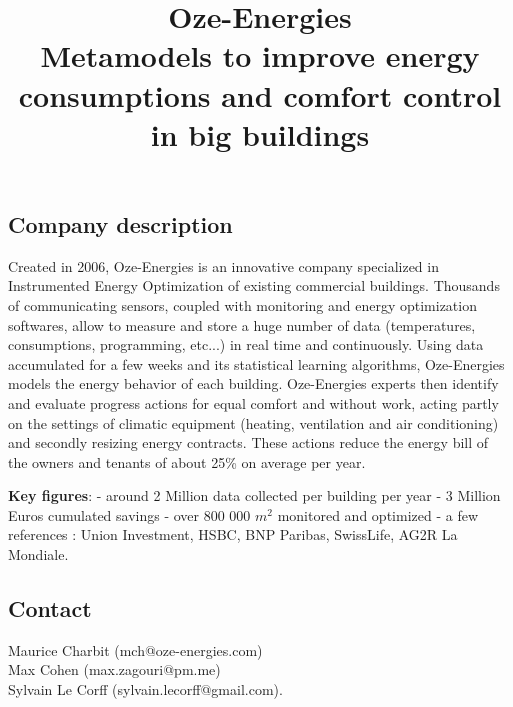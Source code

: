 \documentclass[nolayout]{article}
\begin{document}
\title{Oze-Energies\\
Metamodels to improve energy consumptions and comfort control in big buildings}
\date{}

\author{}

\maketitle

\subsection*{Company description}
Created in 2006, Oze-Energies is an innovative company specialized in Instrumented Energy Optimization of existing commercial buildings. Thousands of communicating sensors, coupled with monitoring and energy optimization softwares, allow to measure and store a huge number of data (temperatures, consumptions, programming, etc...) in real time and continuously. Using data accumulated for a few weeks and its statistical learning algorithms, Oze-Energies models the energy behavior of each building. Oze-Energies experts then identify and evaluate progress actions for equal comfort and without work, acting partly on the settings of climatic equipment (heating, ventilation and air conditioning) and secondly resizing energy contracts. These actions reduce the energy bill of the owners and tenants of about 25\% on average per year. 

\vspace{.2cm}

{\bf Key figures}: - around 2 Million data collected per building per year - 3 Million Euros cumulated savings - over 800 000 $m^2$ monitored and optimized - a few references : Union Investment, HSBC, BNP Paribas, SwissLife, AG2R La Mondiale.

\subsection*{Contact}
Maurice Charbit (mch@oze-energies.com)\\
Max Cohen (max.zagouri@pm.me)\\
Sylvain Le Corff (sylvain.lecorff@gmail.com).
\end{document}
